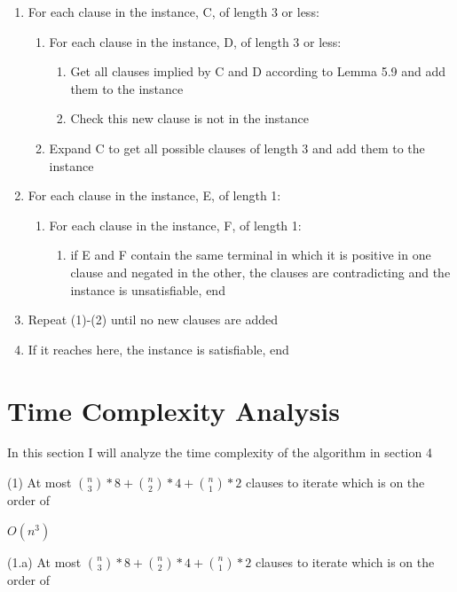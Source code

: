 \documentclass[manuscript]{acmart}
\begin{document}
    \begin{enumerate}
        \item For each clause in the instance, C, of length 3 or less:
        \begin{enumerate}
            \item For each clause in the instance, D, of length 3 or less:
            \begin{enumerate}
                \item Get all clauses implied by C and D according to Lemma 5.9 
                and add them to the instance
                \item Check this new clause is not in the instance
            \end{enumerate}
            \item Expand C to get all possible clauses of length 3 and add them to the instance
        \end{enumerate}
        \item For each clause in the instance, E, of length 1:
        \begin{enumerate}
            \item For each clause in the instance, F, of length 1:
            \begin{enumerate}
                \item if E and F contain the same terminal in which it is 
                positive in one clause and negated in the other, the 
                clauses are contradicting and the instance is unsatisfiable, end
            \end{enumerate}
        \end{enumerate}
        \item Repeat (1)-(2) until no new clauses are added
        \item If it reaches here, the instance is satisfiable, end
    \end{enumerate}

    \section{Time Complexity Analysis}

    In this section I will analyze the time complexity of the algorithm in section 4

    (1) At most ${\binom{n}{3}}*8 + {\binom{n}{2}}*4 + {\binom{n}{1}}*2$ clauses to iterate which is on the order of

    $O(n^3)$

    (1.a) At most ${\binom{n}{3}}*8 + {\binom{n}{2}}*4 + {\binom{n}{1}}*2$ clauses to iterate which is on the order of
\end{document}
